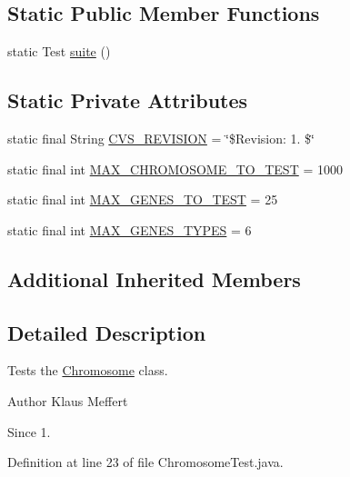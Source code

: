 \subsection*{Static Public Member Functions}
\begin{DoxyCompactItemize}
\item 
static Test \hyperlink{classorg_1_1jgap_1_1_chromosome_test_ae86fdd6f122fabdaa89adcba19c182f8}{suite} ()
\end{DoxyCompactItemize}
\subsection*{Static Private Attributes}
\begin{DoxyCompactItemize}
\item 
static final String \hyperlink{classorg_1_1jgap_1_1_chromosome_test_a1a3841cd59e0654b6e17c762a59e2406}{C\-V\-S\-\_\-\-R\-E\-V\-I\-S\-I\-O\-N} = \char`\"{}\$Revision\-: 1. \$\char`\"{}
\item 
static final int \hyperlink{classorg_1_1jgap_1_1_chromosome_test_a1f7579cded003cd9b4169cc476bffdbc}{M\-A\-X\-\_\-\-C\-H\-R\-O\-M\-O\-S\-O\-M\-E\-\_\-\-T\-O\-\_\-\-T\-E\-S\-T} = 1000
\item 
static final int \hyperlink{classorg_1_1jgap_1_1_chromosome_test_a8f2eac9032a3f66194ae70969aa6ca0a}{M\-A\-X\-\_\-\-G\-E\-N\-E\-S\-\_\-\-T\-O\-\_\-\-T\-E\-S\-T} = 25
\item 
static final int \hyperlink{classorg_1_1jgap_1_1_chromosome_test_abab0e4e99f0b3cd4e7a7ee308d70782f}{M\-A\-X\-\_\-\-G\-E\-N\-E\-S\-\_\-\-T\-Y\-P\-E\-S} = 6
\end{DoxyCompactItemize}
\subsection*{Additional Inherited Members}


\subsection{Detailed Description}
Tests the \hyperlink{classorg_1_1jgap_1_1_chromosome}{Chromosome} class.

\begin{DoxyAuthor}{Author}
Klaus Meffert 
\end{DoxyAuthor}
\begin{DoxySince}{Since}
1. 
\end{DoxySince}


Definition at line 23 of file Chromosome\-Test.\-java.



